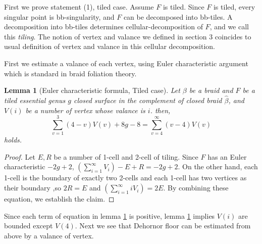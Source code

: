 \documentclass[12pt]{amsart}
\newtheorem{lem}{Lemma}
\begin{document}
   First we prove statement (1), tiled case. Assume $F$ is tiled.
Since $F$ is tiled, every singular point is bb-singularity, and $F$ can be decomposed into bb-tiles. A decomposition into bb-tiles determines cellular-decomposition of $F$, and we call this {\it tiling}. 
The notion of vertex and valance we defined in section 3 coincides to usual definition of vertex and valance in this cellular decomposition. 
 
   First we estimate a valance of each vertex, using Euler characteristic argument which is standard in braid foliation theory.

\begin{lem}[Euler characteristic formula, Tiled case]
\label{lem:eulerform-tiled}
  Let $\beta$ be a braid and $F$ be a tiled essential genus $g$ closed surface in the complement of closed braid $\widehat{\beta}$, and $V(i)$ be a number of vertex whose valance is $i$. then,
\[ \sum_{v=1}^{3}(4-v)V(v)+8g-8= \sum_{v=4}^{\infty}(v-4)V(v)\]
 holds.
 \end{lem}
\begin{proof}
   Let $E,R$ be a number of 1-cell and 2-cell of tiling.
Since $F$ has an Euler characteristic $-2g+2$, $(\sum_{i=1}^{\infty}V_{i}) - E + R = -2g+2$.
On the other hand, each 1-cell is the boundary of exactly two 2-cells and each 1-cell has two vertices as their boundary ,so $2R=E$ and $(\sum_{i=1}^{\infty}iV_{i}) = 2E$. 
By combining these equation, we establish the claim.

\end{proof}
   Since each term of equation in lemma \ref{lem:eulerform-tiled} is positive, lemma \ref{lem:eulerform-tiled} implies $V(i)$ are bounded except $V(4)$. Next we see that Dehornor floor can be estimated from above by a valance of vertex.
\end{document}
